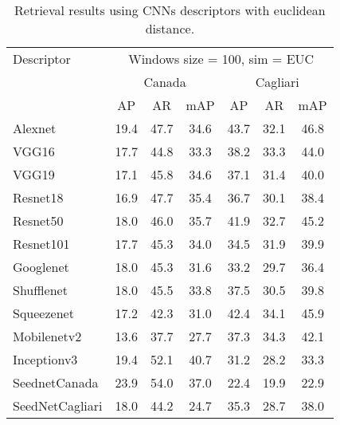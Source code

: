 \documentclass[12pt,italian]{article}
\begin{document}


\begin{table}
	\centering
	\caption{Retrieval results using CNNs descriptors with euclidean distance.}
	\label{tab:retrievalEUC}
	\begin{tabular}{lcccccc}
		\toprule
		Descriptor      &     \multicolumn{6}{c}{Windows size = 100, sim = EUC}     \\
		                & \multicolumn{3}{c}{Canada} & \multicolumn{3}{c}{Cagliari} \\
		                &  AP  &  AR  &     mAP      &  AP  &  AR  &      mAP       \\ \midrule
		Alexnet         & 19.4 & 47.7 &     34.6     & 43.7 & 32.1 &      46.8      \\
		VGG16           & 17.7 & 44.8 &     33.3     & 38.2 & 33.3 &      44.0      \\
		VGG19           & 17.1 & 45.8 &     34.6     & 37.1 & 31.4 &      40.0      \\
		Resnet18        & 16.9 & 47.7 &     35.4     & 36.7 & 30.1 &      38.4      \\
		Resnet50        & 18.0 & 46.0 &     35.7     & 41.9 & 32.7 &      45.2      \\
		Resnet101       & 17.7 & 45.3 &     34.0     & 34.5 & 31.9 &      39.9      \\
		Googlenet       & 18.0 & 45.3 &     31.6     & 33.2 & 29.7 &      36.4      \\
		Shufflenet      & 18.0 & 45.5 &     33.8     & 37.5 & 30.5 &      39.8      \\
		Squeezenet      & 17.2 & 42.3 &     31.0     & 42.4 & 34.1 &      45.9      \\
		Mobilenetv2     & 13.6 & 37.7 &     27.7     & 37.3 & 34.3 &      42.1      \\
		Inceptionv3     & 19.4 & 52.1 &     40.7     & 31.2 & 28.2 &      33.3      \\
		SeednetCanada   & 23.9 & 54.0 &     37.0     & 22.4 & 19.9 &      22.9      \\
		SeedNetCagliari & 18.0 & 44.2 &     24.7     & 35.3 & 28.7 &      38.0      \\ \bottomrule
	\end{tabular}
\end{table}

 \pagebreak 
\end{document}
